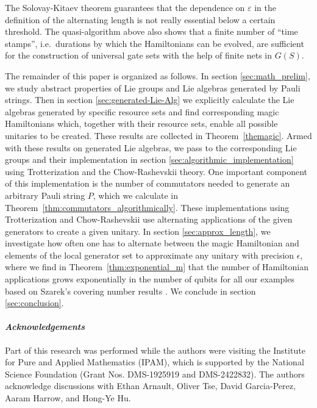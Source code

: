 \documentclass[12pt, a4-paper]{amsart}
\numberwithin{equation}{section}
\newcommand{\eps}{\varepsilon}
\begin{document}
The Solovay-Kitaev theorem guarantees that the dependence on $\eps$ in the definition of the alternating length is not really essential below a certain threshold. The quasi-algorithm above also shows that a finite number of ``time stamps'', i.e.\ durations by which the Hamiltonians can be evolved, are sufficient for the construction of universal gate sets with the help of finite nets in $G(S)$.


The remainder of this paper is organized as follows. In section \ref{sec:math_prelim}, we study abstract properties of Lie groups and Lie algebras generated by Pauli strings. Then in section \ref{sec:generated-Lie-Alg} we explicitly calculate the Lie algebras generated by specific resource sets and find corresponding magic Hamiltonians which, together with their resource sets, enable all possible unitaries to be created. These results are collected in Theorem~\ref{themagic}. Armed with these results on generated Lie algebras, we pass to the corresponding Lie groups and their implementation in section \ref{sec:algorithmic_implementation} using Trotterization and the Chow-Rashevskii theory. One important component of this implementation is the number of commutators needed to generate an arbitrary Pauli string $P$, which we calculate in Theorem~\ref{thm:commutators_algorithmically}. These implementations using Trotterization and Chow-Rashevskii use alternating applications of the given generators to create a given unitary. In section \ref{sec:approx_length}, we investigate how often one has to alternate between the magic Hamiltonian and elements of the local generator set to approximate any unitary with precision $\epsilon$, where we find in Theorem~\ref{thm:exponential_m} that the number of Hamiltonian applications grows exponentially in the number of qubits for all our examples based on Szarek's covering number results \cite{Szarek1998MetricSpaces}. We conclude in section \ref{sec:conclusion}.

\paragraph{\textit{Acknowledgements}} Part of this research was performed while the authors were visiting the Institute for Pure and Applied Mathematics (IPAM), which is supported by the National Science Foundation (Grant Nos. DMS-1925919 and DMS-2422832). The authors acknowledge discussions with Ethan Arnault, Oliver Tse, David Garcia-Perez, Aaram Harrow, and Hong-Ye Hu.
\end{document}
